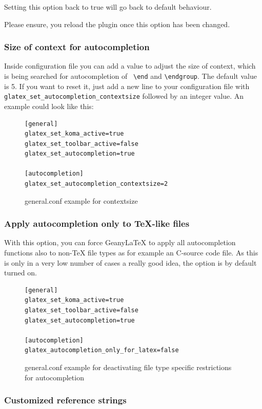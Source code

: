\documentclass[%
paper=a4,%
fontsize=11pt,%
twoside=false,%
DIV18,
headsepline,
plainheadsepline,
footsepline,
plainfootsepline,
bibliography=totoc,%
listof=totoc,%
BCOR10mm,%
parskip=half,%
openany,%
]{scrartcl}
\begin{document}
Setting this option back to true will go back to default behaviour.

Please ensure, you reload the plugin once this option has been changed.

\subsubsection{Size of context for autocompletion}
\label{sec:hidden_pref_autocompletion_context}
Inside configuration file you can add a value to adjust the size of
context, which is being searched for autocompletion of \texttt{
\textbackslash{}end} and \texttt{\textbackslash{}endgroup}. The
default value is 5. If you want to reset it, just add a new line to
your configuration file with
\texttt{glatex\_set\_autocompletion\_contextsize} followed by an integer
value. An example could look like this:

\begin{figure}[h!]
\begin{lstlisting}
[general]
glatex_set_koma_active=true
glatex_set_toolbar_active=false
glatex_set_autocompletion=true

[autocompletion]
glatex_set_autocompletion_contextsize=2
\end{lstlisting}
\caption{general.conf example for contextsize}
\end{figure}

\subsubsection{Apply autocompletion only to \TeX{}-like files}
With this option, you can force Geany\LaTeX{} to apply all autocompletion functions also to non-\TeX{} file types as for example an C-source code file. As this is only in a very low number of cases a really good idea, the option is by default turned on.

\begin{figure}[h!]
\begin{lstlisting}
[general]
glatex_set_koma_active=true
glatex_set_toolbar_active=false
glatex_set_autocompletion=true

[autocompletion]
glatex_autocompletion_only_for_latex=false
\end{lstlisting}
\caption{general.conf example for deactivating file type specific restrictions for autocompletion}
\end{figure}

\subsubsection{Customized reference strings}
\end{document}

